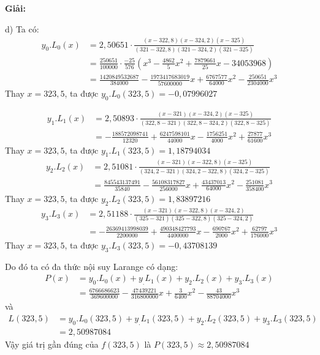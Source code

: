 \textbf{Giải:}\par
d) Ta có:
\begin{align*}
	y_0.L_0(x)	& =2,50651\cdot\frac{(x-322,8)(x-324,2)(x-325)}{(321-322,8)(321-324,2)(321-325)}\\
				& =\frac{250651}{100000}\cdot\frac{-25}{576}\left(x^3-\frac{4862}{5}x^2+\frac{7879661}{25}x-34053968\right)\\
				& =\frac{1420849532687}{384000}-\frac{1973417683019}{57600000}x+\frac{6767577}{64000}x^2-\frac{250651}{2304000}x^3
\end{align*}
Thay $x=323,5$, ta được $y_0.L_0(323,5)=-0,07996027$\par
\begin{align*}
	y_1.L_1(x)	& =2,50893\cdot\frac{(x-321)(x-324,2)(x-325)}{(322,8-321)(322,8-324,2)(322,8-325)}\\
				& =-\frac{188572098741}{12320}+\frac{6247598101}{44000}x-\frac{1756251}{4000}x^2+\frac{27877}{61600}x^3
\end{align*}
Thay $x=323,5$, ta được $y_1.L_1(323,5)=1,18794034$
\begin{align*}
	y_2.L_2(x)	& =2,51081\cdot\frac{(x-321)(x-322,8)(x-325)}{(324,2-321)(324,2-322,8)(324,2-325)}\\
				& =\frac{845543137491}{35840}-\frac{56108317827}{256000}x+\frac{43437013}{64000}x^2-\frac{251081}{358400}x^3
\end{align*}
Thay $x=323,5$, ta được $y_2.L_2(323,5)=1,83897216$
\begin{align*}
	y_3.L_3(x)	& =2,51188\cdot\frac{(x-321)(x-322,8)(x-324,2)}{(325-321)(325-322,8)(325-324,2)}\\
				& =-\frac{26369413998039}{2200000}+\frac{490348427793}{4400000}x-\frac{690767}{2000}x^2+\frac{62797}{176000}x^3
\end{align*}
Thay $x=323,5$, ta được $y_3.L_3(323,5)=-0,43708139$\par
Do đó ta có đa thức nội suy Larange có dạng: \begin{align*}
	P(x)	& =y_0.L_0(x)+y_.L_1(x)+y_2.L_2(x)+y_3.L_3(x)\\
			& =\frac{6766686623}{369600000}-\frac{47439221}{316800000}x+\frac{3}{6400}x^2-\frac{43}{88704000}x^3
\end{align*}
và \begin{align*}
	L(323,5)	& =y_0.L_0(323,5)+y_.L_1(323,5)+y_2.L_2(323,5)+y_3.L_3(323,5)\\
				& =2,50987084
\end{align*}
Vậy giá trị gần đúng của $f(323,5)$ là $P(323,5)\approx 2,50987084$\par

